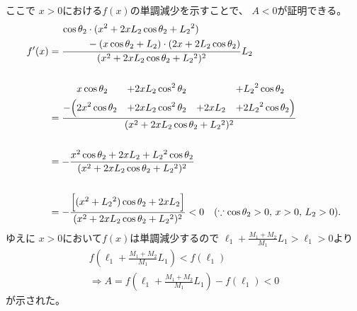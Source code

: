 \documentclass[a4paper,11pt]{jsarticle}
\begin{document}
ここで
$x>0$における$f(x)$の単調減少を示すことで、
$A<0$が証明できる。
\begin{align*}
  f' (x)
  &= \frac{
    \begin{aligned}
      \cos\theta_2 &\cdot (x{}^2 + 2xL_2\cos\theta_2 + L_2{}^2)
      \\
      &- (x\cos\theta_2 + L_2)\cdot (2x + 2L_2\cos\theta_2)
    \end{aligned}
  }{
    (x{}^2 + 2xL_2\cos\theta_2 + L_2{}^2)^2
  }
  L_2
  \\
  \\
  &= \frac{
    \begin{aligned}
      &x\cos\theta_2 
      &+& 2xL_2\cos^2\theta_2 
      &&
      &+& L_2{}^2\cos\theta_2
      \\
      -\Big(
        &2x{}^2\cos\theta_2 
        &+& 2xL_2\cos^2\theta_2
        &+& 2xL_2
        &+& 2L_2{}^2\cos\theta_2
      \Big)
    \end{aligned}
  }{
    (x{}^2 + 2xL_2\cos\theta_2 + L_2{}^2)^2
  }
  \\
  \\
  &=-\frac{
    x{}^2\cos\theta_2 + 2xL_2 + L_2{}^2\cos\theta_2
  }{
    (x{}^2 + 2xL_2\cos\theta_2 + L_2{}^2)^2
  }
  \\
  \\
  &= -\frac{
    \Bigl[(x{}^2 + L_2{}^2)\cos\theta_2 + 2xL_2\Bigr]
  }{
    (x{}^2 + 2xL_2\cos\theta_2 + L_2{}^2)^2
  }
  < 0 \quad (\because \cos\theta_2 > 0, \, x > 0, \, L_2 > 0).
\end{align*}
ゆえに
$x>0$において$f(x)$は単調減少するので
$\ell_1 + \frac{M_1+M_2}{M_1}L_1 > \ell_1 > 0$より
\begin{gather*}
  f\left(\ell_1 + \frac{M_1+M_2}{M_1}L_1\right) < f(\ell_1)
  \\
  \Rightarrow
  A = f\left(\ell_1 + \frac{M_1+M_2}{M_1}L_1\right) - f(\ell_1) < 0
\end{gather*}
が示された。
\end{document}
